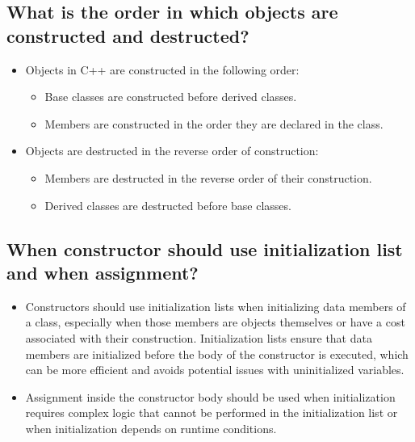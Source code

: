\subsection{What is the order in which objects are constructed and destructed?}
\begin{itemize}
    \item Objects in C++ are constructed in the following order:
    \begin{itemize}
        \item Base classes are constructed before derived classes.
        \item Members are constructed in the order they are declared in the class.
    \end{itemize}
    \item Objects are destructed in the reverse order of construction:
    \begin{itemize}
        \item Members are destructed in the reverse order of their construction.
        \item Derived classes are destructed before base classes.
    \end{itemize}
\end{itemize}

\subsection{When constructor should use initialization list and when assignment?}
\begin{itemize}
\item Constructors should use initialization lists when initializing data members of a class, especially when those members are objects themselves or have a cost associated with their construction. Initialization lists ensure that data members are initialized before the body of the constructor is executed, which can be more efficient and avoids potential issues with uninitialized variables.
\item Assignment inside the constructor body should be used when initialization requires complex logic that cannot be performed in the initialization list or when initialization depends on runtime conditions.
\end{itemize}

